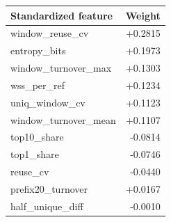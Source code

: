 \begin{tabular}{lr}
\toprule
Standardized feature & Weight \\
\midrule
window\_reuse\_cv & +0.2815 \\
entropy\_bits & +0.1973 \\
window\_turnover\_max & +0.1303 \\
wss\_per\_ref & +0.1234 \\
uniq\_window\_cv & +0.1123 \\
window\_turnover\_mean & +0.1107 \\
top10\_share & -0.0814 \\
top1\_share & -0.0746 \\
reuse\_cv & -0.0440 \\
prefix20\_turnover & +0.0167 \\
half\_unique\_diff & -0.0010 \\
\bottomrule
\end{tabular}

